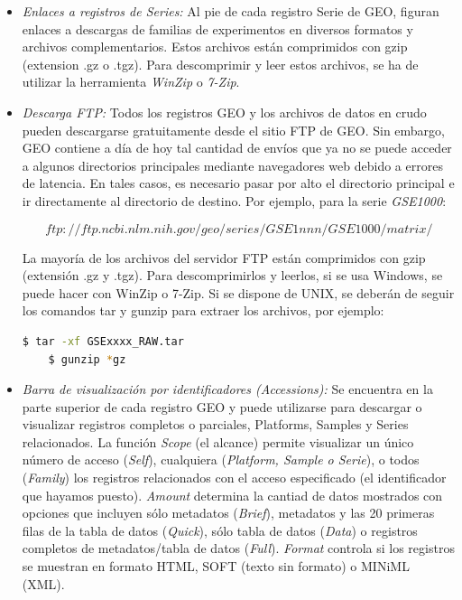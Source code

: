 \begin{itemize}
    \item \textit{Enlaces a registros de Series:} Al pie de cada registro Serie de GEO, figuran enlaces a descargas de familias de experimentos en diversos formatos y archivos complementarios.
    Estos archivos están comprimidos con gzip (extension .gz o .tgz). Para descomprimir y leer estos archivos, se ha de utilizar la herramienta \textit{WinZip} o \textit{7-Zip}.
    \item \textit{Descarga FTP:} Todos los registros GEO y los archivos de datos en crudo pueden descargarse gratuitamente desde el sitio FTP de GEO. Sin embargo, GEO contiene a día de hoy tal
    cantidad de envíos que ya no se puede acceder a algunos directorios principales mediante navegadores web debido a errores de latencia. En tales casos, es necesario pasar por alto el directorio 
    principal e ir directamente al directorio de destino. Por ejemplo, para la serie \textit{GSE1000}:

    \[
        ftp://ftp.ncbi.nlm.nih.gov/geo/series/GSE1nnn/GSE1000/matrix/ 
    \]
    
    La mayoría de los archivos del servidor FTP están comprimidos con gzip (extensión .gz y .tgz). Para descomprimirlos y leerlos, si se usa Windows, se puede hacer con WinZip o 7-Zip. Si se dispone 
    de UNIX, se deberán de seguir los comandos tar y gunzip para extraer los archivos, por ejemplo: \newline

    \begin{lstlisting}[language=bash, backgroundcolor=\color{lightgray}, basicstyle=\ttfamily, keywordstyle=\color{blue}, numbers=none]
    $ tar -xf GSExxxx_RAW.tar
    $ gunzip *gz \end{lstlisting}
        
    \item  \textit{Barra de visualización por identificadores (\textit{Accessions}):} Se encuentra en la parte superior de cada registro GEO y puede utilizarse para descargar o visualizar registros completos o parciales,
    Platforms, Samples y Series relacionados. La función \textit{Scope} (el alcance) permite visualizar un único número de acceso (\textit{Self}), cualquiera (\textit{Platform, Sample o Serie}),
    o todos (\textit{Family}) los registros relacionados con el acceso especificado (el identificador que hayamos puesto). \textit{Amount} determina la cantiad de datos mostrados con opciones que incluyen 
    sólo metadatos (\textit{Brief}), metadatos y las 20 primeras filas de la tabla de datos (\textit{Quick}), sólo tabla de datos (\textit{Data}) o registros completos de metadatos/tabla de datos (\textit{Full}). 
    \textit{Format} controla si los registros se muestran en formato HTML, SOFT (texto sin formato) o MINiML (XML).


\end{itemize}
